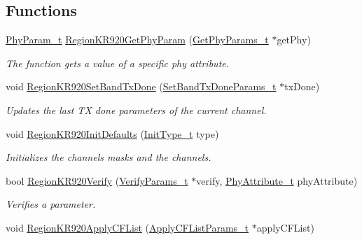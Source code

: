 \subsection*{Functions}
\begin{DoxyCompactItemize}
\item 
\hyperlink{group__REGION_gaed159b26e5c4677236b6e8677019db30}{Phy\+Param\+\_\+t} \hyperlink{group__REGIONKR920_ga108b8547f585d92dd1198c18fc262fa2}{Region\+K\+R920\+Get\+Phy\+Param} (\hyperlink{group__REGION_gab471483fff904f4f89bbc03f7fc380ab}{Get\+Phy\+Params\+\_\+t} $\ast$get\+Phy)
\begin{DoxyCompactList}\small\item\em The function gets a value of a specific phy attribute. \end{DoxyCompactList}\item 
void \hyperlink{group__REGIONKR920_ga93e0503b380c2029572737e3fbbcb104}{Region\+K\+R920\+Set\+Band\+Tx\+Done} (\hyperlink{group__REGION_gad0524aa0673c0814a71e7a4f9cade3fc}{Set\+Band\+Tx\+Done\+Params\+\_\+t} $\ast$tx\+Done)
\begin{DoxyCompactList}\small\item\em Updates the last TX done parameters of the current channel. \end{DoxyCompactList}\item 
void \hyperlink{group__REGIONKR920_gad6e5f4b30063e9fbd8f6e1b6dea1444d}{Region\+K\+R920\+Init\+Defaults} (\hyperlink{group__REGION_gaddc73ae10673ec925724e7870363bda9}{Init\+Type\+\_\+t} type)
\begin{DoxyCompactList}\small\item\em Initializes the channels masks and the channels. \end{DoxyCompactList}\item 
bool \hyperlink{group__REGIONKR920_ga8d91d301043467b48a4ae7f86800a48d}{Region\+K\+R920\+Verify} (\hyperlink{group__REGION_ga966d97bc2f25df1c09e92e60ef652276}{Verify\+Params\+\_\+t} $\ast$verify, \hyperlink{group__REGION_ga9445b07fdf77581ecfaf389970e635f8}{Phy\+Attribute\+\_\+t} phy\+Attribute)
\begin{DoxyCompactList}\small\item\em Verifies a parameter. \end{DoxyCompactList}\item 
void \hyperlink{group__REGIONKR920_ga7b758b39bc0f003f90deaa751a596b02}{Region\+K\+R920\+Apply\+C\+F\+List} (\hyperlink{group__REGION_ga71588e9ad07e34b78fa91d51881fd3c6}{Apply\+C\+F\+List\+Params\+\_\+t} $\ast$apply\+C\+F\+List)

\end{DoxyCompactItemize}
